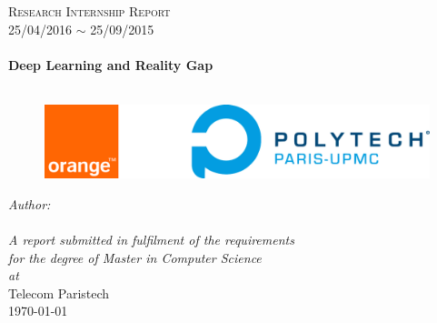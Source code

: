 \documentclass[twoside,11pt,a4paper,openright]{Thesis} %
\begin{document}
\begin{titlepage}
\begin{center}

\textsc{\LARGE Research Internship Report}\\[0.1cm]
{\Large 25/04/2016  $\sim$  25/09/2015}\\[0.5cm] %

\HRule \\[0.4cm] %
{\textbf{\huge  Deep Learning and Reality Gap}}\\[0cm] %
\HRule \\[2.5cm] %

\begin{figure}[htbp]
	\centering
		\includegraphics[width=\textwidth,height=\textheight,keepaspectratio]{Figures/logo.png}
\end{figure}
\vspace{2.2cm}

\emph{\LARGE Author:}\\[0.2cm]
{\LARGE\authornames}\\[2.8cm]%




\large \textit{A report submitted in fulfilment of the requirements\\ for the degree of Master in Computer Science}\\[0.3cm] %
\textit{at}\\[0.4cm]
{\Large Telecom Paristech}\\[2.5cm] %

{\large \today}\\[4cm] %

\vfill
\end{center}
\cleardoublepage
\end{titlepage}
\end{document}
